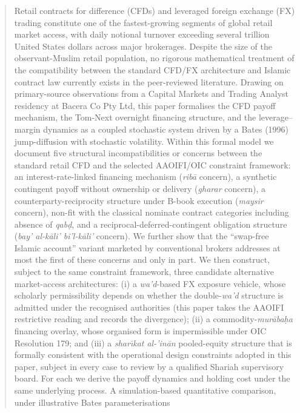 \documentclass[preprint,12pt,authoryear]{elsarticle}
\theoremstyle{definition}
\begin{document}
\begin{frontmatter}
\begin{abstract}
Retail contracts for difference (CFDs) and leveraged foreign exchange
(FX) trading constitute one of the fastest-growing segments of global
retail market access, with daily notional turnover exceeding several
trillion United States dollars across major brokerages. Despite the
size of the observant-Muslim retail population, no rigorous mathematical
treatment of the compatibility between the standard CFD/FX architecture
and Islamic contract law currently exists in the peer-reviewed
literature. Drawing on primary-source observations from a Capital
Markets and Trading Analyst residency at Bacera Co Pty Ltd, this paper
formalises the CFD payoff mechanism, the Tom-Next overnight financing
structure, and the leverage--margin dynamics as a coupled stochastic
system driven by a Bates (1996) jump-diffusion with stochastic
volatility. Within this formal model we document five structural
incompatibilities or concerns between the standard retail CFD and the
selected AAOIFI/OIC constraint framework: an interest-rate-linked
financing mechanism (\emph{rib\={a}} concern), a synthetic contingent
payoff without ownership or delivery (\emph{gharar} concern), a
counterparty-reciprocity structure under B-book execution
(\emph{maysir} concern), non-fit with the classical nominate contract
categories including absence of \emph{qab\d{d}}, and a
reciprocal-deferred-contingent obligation structure
(\emph{bay' al-k\={a}li' bi'l-k\={a}li'} concern). We further show
that the ``swap-free Islamic account'' variant marketed by conventional
brokers addresses at most the first of these concerns and only in
part. We then construct, subject to the same constraint framework,
three candidate alternative market-access architectures: (i) a
\emph{wa'd}-based FX exposure vehicle, whose scholarly permissibility
depends on whether the double-\emph{wa'd} structure is admitted under
the recognised authorities (this paper takes the AAOIFI restrictive
reading and records the divergence); (ii) a
commodity-\emph{mur\={a}ba\d{h}a} financing overlay, whose organised
form is impermissible under OIC Resolution 179; and (iii) a
\emph{shar\={\i}kat al-'in\={a}n} pooled-equity structure that is
formally consistent with the operational design constraints adopted
in this paper, subject in every case to review by a qualified Shariah
supervisory board. For each we derive the payoff dynamics and holding
cost under the same underlying process. A simulation-based
quantitative comparison, under illustrative Bates parameterisations

\end{abstract}
\end{frontmatter}
\end{document}
